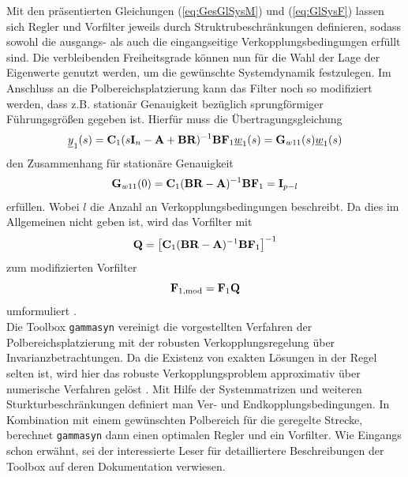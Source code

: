 Mit den präsentierten Gleichungen (\ref{eq:GesGlSysM}) und (\ref{eq:GlSysF}) lassen sich Regler und Vorfilter jeweils durch Struktrubeschränkungen definieren, sodass sowohl die ausgangs- als auch die eingangseitige Verkopplungsbedingungen erfüllt sind. Die verbleibenden Freiheitsgrade können nun für die Wahl der Lage der Eigenwerte genutzt werden, um die gewünschte Systemdynamik festzulegen. Im Anschluss an die Polbereichsplatzierung kann das Filter noch so modifiziert werden, dass z.B. stationär Genauigkeit bezüglich sprungförmiger Führungsgrößen gegeben ist.
Hierfür muss die Übertragungsgleichung 
\begin{equation}
	\underline{y}_{1}(s) = \textbf{C}_1(s\textbf{I}_{n}-\textbf{A}+\textbf{B}\textbf{R})^{-1}\textbf{B}\textbf{F}_{1}\underline{w}_{1}(s) = \textbf{G}_{w11}(s) \underline{w}_{1}(s) 
\end{equation}
den Zusammenhang für stationäre Genauigkeit 
\begin{equation}
	\textbf{G}_{w11}(0) = \textbf{C}_1(\textbf{B}\textbf{R}-\textbf{A})^{-1}\textbf{B}\textbf{F}_{1} = \textbf{I}_{p-l}
\end{equation}
erfüllen. Wobei $l$ die Anzahl an Verkopplungsbedingungen beschreibt.
Da dies im Allgemeinen nicht geben ist, wird das Vorfilter mit
\begin{equation}
	\textbf{Q} = \left[\textbf{C}_1(\textbf{B}\textbf{R}-\textbf{A})^{-1}\textbf{B}\textbf{F}_{1}\right]^{-1}
\end{equation}
zum modifizierten Vorfilter
\begin{equation}\label{eq:f_mod}
	\textbf{F}_{1,\textnormal{mod}} = \textbf{F}_{1}\textbf{Q}
\end{equation}
umformuliert \cite{Mehrgr}.
\\


Die Toolbox \texttt{gammasyn} vereinigt die vorgestellten Verfahren der Polbereichsplatzierung mit der robusten Verkopplungsregelung über Invarianzbetrachtungen. Da die Existenz von exakten Lösungen in der Regel selten ist, wird hier das robuste Verkopplungsproblem approximativ über numerische Verfahren gelöst \cite{Schaub}. 
Mit Hilfe der Systemmatrizen und weiteren Sturkturbeschränkungen definiert man Ver- und Endkopplungsbedingungen. In Kombination mit einem gewünschten Polbereich für die geregelte Strecke, berechnet \texttt{gammasyn} dann einen optimalen Regler und ein Vorfilter. Wie Eingangs schon erwähnt, sei der interessierte Leser für detailliertere Beschreibungen der Toolbox auf deren Dokumentation verwiesen.\\


%
%
%





